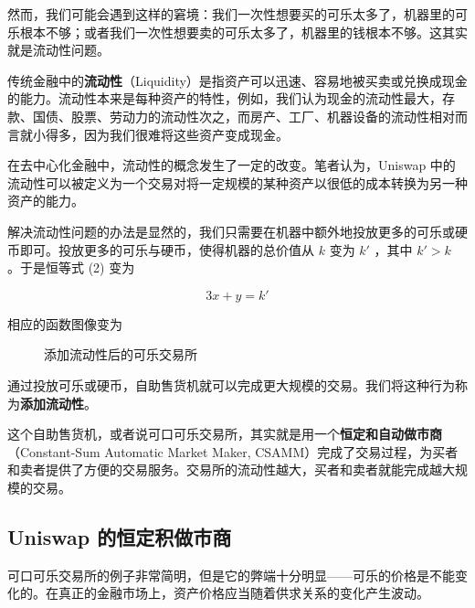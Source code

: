 \documentclass[12pt, a4paper, oneside]{ctexart}
\begin{document}
然而，我们可能会遇到这样的窘境：我们一次性想要买的可乐太多了，机器里的可乐根本不够；或者我们一次性想要卖的可乐太多了，机器里的钱根本不够。这其实就是流动性问题。

传统金融中的\textbf{流动性}（Liquidity）是指资产可以迅速、容易地被买卖或兑换成现金的能力。流动性本来是每种资产的特性，例如，我们认为现金的流动性最大，存款、国债、股票、劳动力的流动性次之，而房产、工厂、机器设备的流动性相对而言就小得多，因为我们很难将这些资产变成现金。

在去中心化金融中，流动性的概念发生了一定的改变。笔者认为，Uniswap 中的流动性可以被定义为一个交易对将一定规模的某种资产以很低的成本转换为另一种资产的能力。

解决流动性问题的办法是显然的，我们只需要在机器中额外地投放更多的可乐或硬币即可。投放更多的可乐与硬币，使得机器的总价值从 $k$ 变为 $k'$ ，其中 $k' > k$ 。于是恒等式 (2) 变为

\begin{equation}
    3x + y = k'
\end{equation}

\noindent 相应的函数图像变为

\begin{figure}[htbp]
    \centering
    \caption{添加流动性后的可乐交易所}
\end{figure}

通过投放可乐或硬币，自助售货机就可以完成更大规模的交易。我们将这种行为称为\textbf{添加流动性}。

这个自助售货机，或者说可口可乐交易所，其实就是用一个\textbf{恒定和自动做市商}（Constant-Sum Automatic Market Maker, CSAMM）完成了交易过程，为买者和卖者提供了方便的交易服务。交易所的流动性越大，买者和卖者就能完成越大规模的交易。

\subsection{Uniswap 的恒定积做市商}

可口可乐交易所的例子非常简明，但是它的弊端十分明显——可乐的价格是不能变化的。在真正的金融市场上，资产价格应当随着供求关系的变化产生波动。
\end{document}
